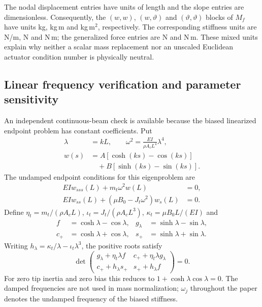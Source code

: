 The nodal displacement entries have units of length and the slope
entries are dimensionless. Consequently, the $(w,w)$, $(w,\vartheta)$
and $(\vartheta,\vartheta)$ blocks of $M_f$ have units kg, kg\,m and
kg\,m$^2$, respectively. The corresponding stiffness units are
N/m, N and N\,m; the generalized force entries are N and N\,m.
These mixed units explain why neither a scalar mass replacement nor
an unscaled Euclidean actuator condition number is physically neutral.

\subsection{Linear frequency verification and parameter sensitivity}
\label{sm:fe-check}
An independent continuous-beam check is available because the biased
linearized endpoint problem has constant coefficients. Put
\begin{align}
 \lambda&=kL,\qquad
 \omega^2=\frac{EI}{\rho A_cL^4}\lambda^4,\nonumber\\
 w(s)&=A[\cosh(ks)-\cos(ks)]\nonumber\\
 &\quad+B[\sinh(ks)-\sin(ks)].
 \label{sm:characteristic-shape}
\end{align}
The undamped endpoint conditions for this eigenproblem are
\begin{align}
 EIw_{sss}(L)+m_t\omega^2w(L)&=0,\nonumber\\
 EIw_{ss}(L)+(\mu B_0-J_t\omega^2)w_s(L)&=0.
 \label{sm:characteristic-bc}
\end{align}
Define $\eta_t=m_t/(\rho A_cL)$,
$\iota_t=J_t/(\rho A_cL^3)$,
$\kappa_t=\mu B_0L/(EI)$ and
\begin{align*}
 f&=\cosh\lambda-\cos\lambda,&
 g_\lambda&=\sinh\lambda-\sin\lambda,\\
 c_+&=\cosh\lambda+\cos\lambda,&
 s_+&=\sinh\lambda+\sin\lambda.
\end{align*}
Writing $h_\lambda=\kappa_t/\lambda-\iota_t\lambda^3$, the positive
roots satisfy
\begin{equation}
 \det\begin{pmatrix}
 g_\lambda+\eta_t\lambda f&
 c_++\eta_t\lambda g_\lambda\\
 c_++h_\lambda s_+&
 s_++h_\lambda f
 \end{pmatrix}=0.
 \label{sm:characteristic-determinant}
\end{equation}
For zero tip inertia and zero bias this reduces to
$1+\cosh\lambda\cos\lambda=0$. The damped frequencies are not used in
mass normalization; $\omega_j$ throughout the paper denotes the
undamped frequency of the biased stiffness.


